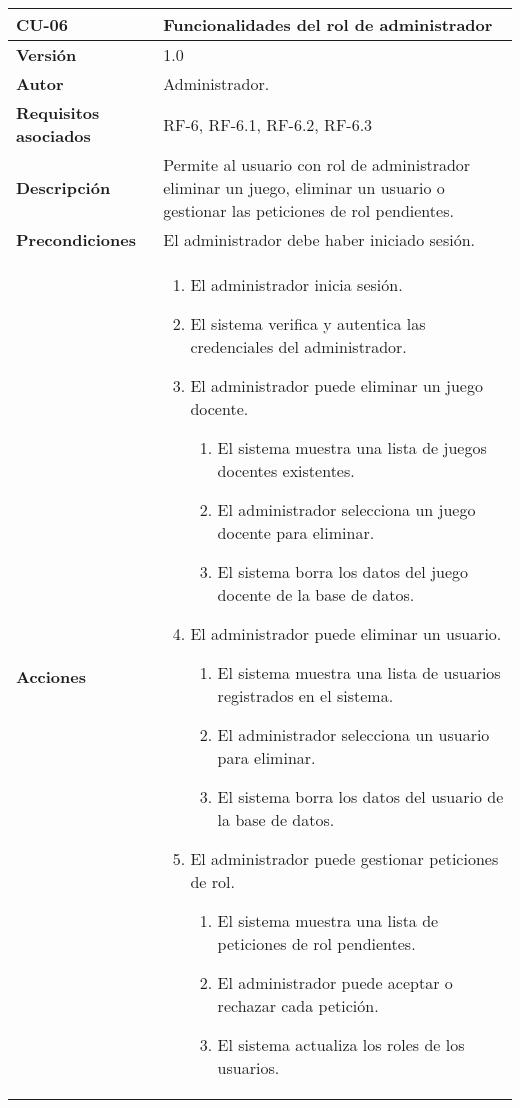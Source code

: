 \begin{table}[p]
	\centering
	\begin{tabularx}{\linewidth}{ p{} p{} }
		\toprule
		\textbf{CU-06}    & \textbf{Funcionalidades del rol de administrador}\\
		\toprule
		\textbf{Versión}              & 1.0    \\
		\textbf{Autor}                & Administrador. \\
		\textbf{Requisitos asociados} & RF-6, RF-6.1, RF-6.2, RF-6.3 \\
		\textbf{Descripción}          & Permite al usuario con rol de administrador eliminar un juego, eliminar un usuario o gestionar las peticiones de rol pendientes.\\
		\textbf{Precondiciones}         & El administrador debe haber iniciado sesión. \\
		\textbf{Acciones}             &
\begin{enumerate}
	\item El administrador inicia sesión.
	\item El sistema verifica y autentica las credenciales del administrador.
	\item El administrador puede eliminar un juego docente.
    	\begin{enumerate}
    		\renewcommand{\labelenumii}{\arabic{enumi}.\arabic{enumii}}
    		\item El sistema muestra una lista de juegos docentes existentes.
    		\item El administrador selecciona un juego docente para eliminar.
    		\item El sistema borra los datos del juego docente de la base de datos.
    	\end{enumerate}
    \item El administrador puede eliminar un usuario.
    	\begin{enumerate}
    		\renewcommand{\labelenumii}{\arabic{enumi}.\arabic{enumii}}
    		\item El sistema muestra una lista de usuarios registrados en el sistema.
    		\item El administrador selecciona un usuario para eliminar.
    		\item El sistema borra los datos del usuario de la base de datos.
    	\end{enumerate}
    \item El administrador puede gestionar peticiones de rol.
    	\begin{enumerate}
    		\renewcommand{\labelenumii}{\arabic{enumi}.\arabic{enumii}}
    		\item El sistema muestra una lista de peticiones de rol pendientes.
    		\item El administrador puede aceptar o rechazar cada petición.
    		\item El sistema actualiza los roles de los usuarios.
    	\end{enumerate}


\end{enumerate}
\end{tabularx}
\end{table}
